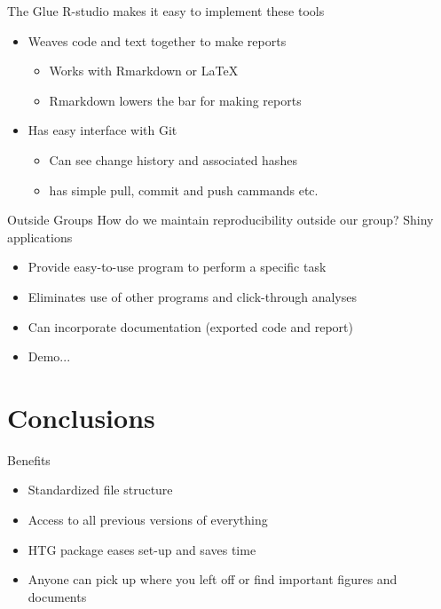 \documentclass{beamer}\usepackage[]{graphicx}\usepackage[]{color}
\begin{document}
\begin{frame}{The Glue}
R-studio makes it easy to implement these tools
\bigskip
\begin{itemize}
\item Weaves code and text together to make reports 
\bigskip
  \begin{itemize}
  \item Works with Rmarkdown or \LaTeX
  \smallskip
  \item Rmarkdown lowers the bar for making reports
  \end{itemize}
\bigskip
\pause
\item Has easy interface with Git
  \begin{itemize}
  \item Can see change history and associated hashes
  \item has simple pull, commit and push cammands etc.
  \end{itemize}
\end{itemize}
\end{frame}

\begin{frame}{Outside Groups}
How do we maintain reproducibility outside our group?
\pause
Shiny applications
\begin{itemize}
\item Provide easy-to-use program to perform a specific task
\item Eliminates use of other programs and click-through analyses
\item Can incorporate documentation (exported code and report)
\item Demo...
\end{itemize}
\end{frame}




\section{Conclusions}



\begin{frame}{Benefits}
\begin{itemize}
\item Standardized file structure
\bigskip
\item Access to all previous versions of everything
\bigskip
\item HTG package eases set-up and saves time
\bigskip
\item Anyone can pick up where you left off or find important figures and documents
\end{itemize}
\end{frame}
\end{document}
